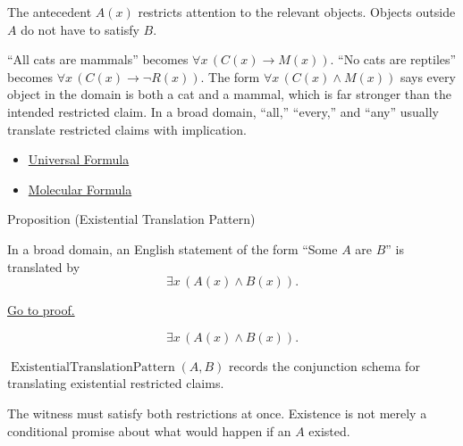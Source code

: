 \begin{remark*}[Interpretation]
The antecedent \(A(x)\) restricts attention to the relevant objects. Objects
outside \(A\) do not have to satisfy \(B\).
\end{remark*}

\begin{remark*}[Exposition]
``All cats are mammals'' becomes \(\forall x\,(C(x)\to M(x))\). ``No cats are
reptiles'' becomes \(\forall x\,(C(x)\to \neg R(x))\). The form
\(\forall x\,(C(x)\land M(x))\) says every object in the domain is both a cat
and a mammal, which is far stronger than the intended restricted claim. In a
broad domain, ``all,'' ``every,'' and ``any'' usually translate restricted
claims with implication.
\end{remark*}

\begin{dependencies}
\begin{itemize}
  \item \hyperref[def:universal-q]{Universal Formula}
  \item \hyperref[def:molecular]{Molecular Formula}
\end{itemize}
\end{dependencies}

\begin{propositionbox}{Proposition (Existential Translation Pattern)}
\begin{proposition}
\label{prop:existential-translation-pattern}
In a broad domain, an English statement of the form ``Some \(A\) are \(B\)''
is translated by
\[
\exists x\,(A(x)\land B(x)).
\]

\noindent\hyperref[prf:existential-translation-pattern]{Go to proof.}
\end{proposition}
\end{propositionbox}

\begin{remark*}
\[
\exists x\,(A(x)\land B(x)).
\]
\end{remark*}

\begin{remark*}
\(\operatorname{ExistentialTranslationPattern}(A,B)\) records the conjunction
schema for translating existential restricted claims.
\end{remark*}

\begin{remark*}[Interpretation]
The witness must satisfy both restrictions at once. Existence is not merely a
conditional promise about what would happen if an \(A\) existed.
\end{remark*}

